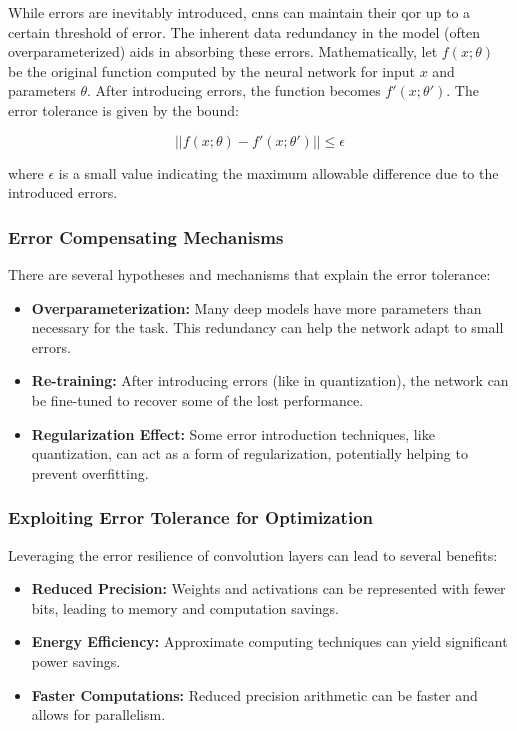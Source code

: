 While errors are inevitably introduced, \glspl{cnn} can maintain their \gls{qor} up to a certain threshold of error. The inherent data redundancy in the model (often overparameterized) aids in absorbing these errors. Mathematically, let \( f(x; \theta) \) be the original function computed by the neural network for input \( x \) and parameters \( \theta \). After introducing errors, the function becomes \( f'(x; \theta') \). The error tolerance is given by the bound:

\begin{equation}
||f(x; \theta) - f'(x; \theta')|| \leq \epsilon
\end{equation}

where \( \epsilon \) is a small value indicating the maximum allowable difference due to the introduced errors.

\subsubsection{Error Compensating Mechanisms}

There are several hypotheses and mechanisms that explain the error tolerance:

\begin{itemize}
	\item \textbf{Overparameterization:} Many deep models have more parameters than necessary for the task. This redundancy can help the network adapt to small errors.
	\item \textbf{Re-training:} After introducing errors (like in quantization), the network can be fine-tuned to recover some of the lost performance.
	\item \textbf{Regularization Effect:} Some error introduction techniques, like quantization, can act as a form of regularization, potentially helping to prevent overfitting.
\end{itemize}

\subsubsection{Exploiting Error Tolerance for Optimization}

Leveraging the error resilience of convolution layers can lead to several benefits:

\begin{itemize}
	\item \textbf{Reduced Precision:} Weights and activations can be represented with fewer bits, leading to memory and computation savings.
	\item \textbf{Energy Efficiency:} Approximate computing techniques can yield significant power savings.
	\item \textbf{Faster Computations:} Reduced precision arithmetic can be faster and allows for parallelism.
\end{itemize}

